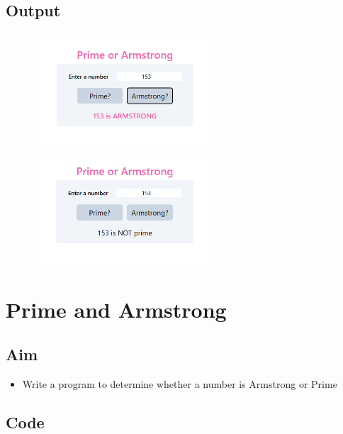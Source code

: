 \documentclass{article}
\begin{document}
\subsection{Output}
\begin{figure}[h!]
	\centering
	\includegraphics[width=0.6\textwidth]{./Assets/p0901.png}
	\includegraphics[width=0.6\textwidth]{./Assets/p0902.png}
\end{figure}
\newpage

\section{Prime and Armstrong}
\subsection{Aim}
\begin{itemize}
	\item Write a program to determine whether a number is Armstrong or Prime
\end{itemize}

\subsection{Code}
\inputminted[frame=lines, linenos, breaklines, breakanywhere, numberblanklines=false]{html}{./prog_9/index.html}
\end{document}

